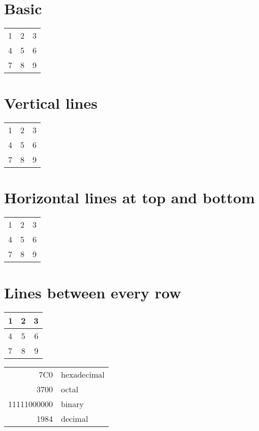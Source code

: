 \documentclass{article}
\begin{document}

  \section{Basic}

  \begin{tabular}{ l c r }
    1 & 2 & 3 \\
    4 & 5 & 6 \\
    7 & 8 & 9 \\
  \end{tabular}

  \section{Vertical lines}

  \begin{tabular}{ l | c | r }
    1 & 2 & 3 \\
    4 & 5 & 6 \\
    7 & 8 & 9 \\
  \end{tabular}

  \section{Horizontal lines at top and bottom}

  \begin{tabular}{ l | c | r }
    \hline
    1 & 2 & 3 \\
    4 & 5 & 6 \\
    7 & 8 & 9 \\
    \hline
  \end{tabular}

  \section{Lines between every row}

  \begin{center}
    \begin{tabular}{ l | c | r }
      \hline
      1 & 2 & 3 \\ \hline
      4 & 5 & 6 \\ \hline
      7 & 8 & 9 \\
      \hline
    \end{tabular}
  \end{center}

  \begin{tabular}{|r|l|}
    \hline
    7C0 & hexadecimal \\
    3700 & octal \\ \cline{2-2}
    11111000000 & binary \\
    \hline \hline
    1984 & decimal \\
    \hline
  \end{tabular}
\end{document}
